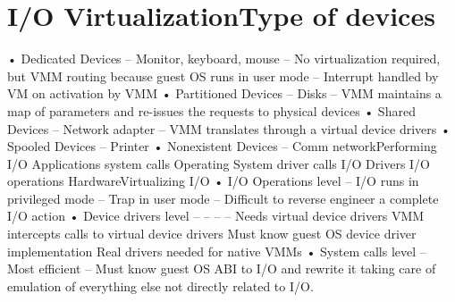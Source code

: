 \documentclass[10pt]{article}
\begin{document}
\section{I/O VirtualizationType of devices}
•  Dedicated Devices
–  Monitor, keyboard, mouse
–  No virtualization required, but VMM routing because guest
OS runs in user mode
–  Interrupt handled by VM on activation by VMM
•  Partitioned Devices
–  Disks
–  VMM maintains a map of parameters and re-issues the
requests to physical devices
•  Shared Devices
–  Network adapter
–  VMM translates through a virtual device drivers
•  Spooled Devices
–  Printer
•  Nonexistent Devices
–  Comm networkPerforming I/O
Applications
system calls
Operating System
driver calls
I/O Drivers
I/O operations
HardwareVirtualizing I/O
•  I/O Operations level
–  I/O runs in privileged mode
–  Trap in user mode
–  Difficult to reverse engineer a complete I/O action
•  Device drivers level
– 
– 
– 
– 
Needs virtual device drivers
VMM intercepts calls to virtual device drivers
Must know guest OS device driver implementation
Real drivers needed for native VMMs
•  System calls level
–  Most efficient
–  Must know guest OS ABI to I/O and rewrite it taking
care of emulation of everything else not directly
related to I/O.
\end{document}
